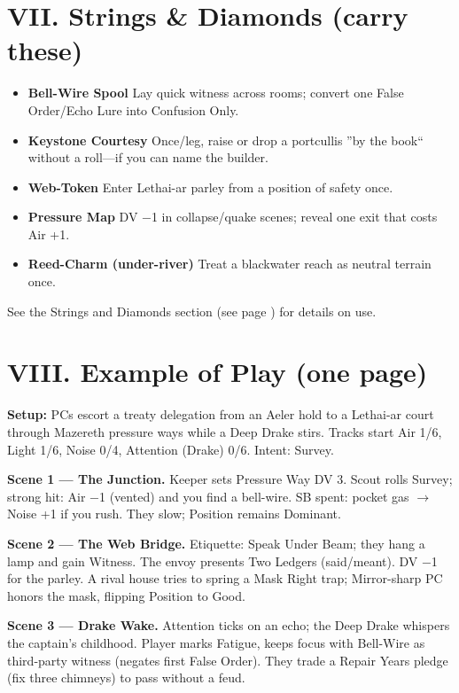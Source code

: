 \documentclass[11pt]{article}
\begin{document}
\section{VII. Strings \& Diamonds (carry these)}
\label{sec:stringdiamond}

\begin{itemize}
    \item \textbf{Bell-Wire Spool} Lay quick witness across rooms; convert one False Order/Echo Lure into Confusion Only.
    \item \textbf{Keystone Courtesy} Once/leg, raise or drop a portcullis ''by the book`` without a roll---if you can name the builder.
    \item \textbf{Web-Token} Enter Lethai-ar parley from a position of safety once.
    \item \textbf{Pressure Map} DV −1 in collapse/quake scenes; reveal one exit that costs Air +1.
    \item \textbf{Reed-Charm (under-river)} Treat a blackwater reach as neutral terrain once.
\end{itemize}

\noindent See the Strings and Diamonds section (see page \pageref{sec:stringdiamond}) for details on use.

\section{VIII. Example of Play (one page)}
\textbf{Setup:} PCs escort a treaty delegation from an Aeler hold to a Lethai-ar court through Mazereth pressure ways while a Deep Drake stirs. Tracks start Air 1/6, Light 1/6, Noise 0/4, Attention (Drake) 0/6. Intent: Survey.

\textbf{Scene 1 --- The Junction.} Keeper sets Pressure Way DV 3. Scout rolls Survey; strong hit: Air −1 (vented) and you find a bell-wire. SB spent: pocket gas $\rightarrow$ Noise +1 if you rush. They slow; Position remains Dominant.

\textbf{Scene 2 --- The Web Bridge.} Etiquette: Speak Under Beam; they hang a lamp and gain Witness. The envoy presents Two Ledgers (said/meant). DV −1 for the parley. A rival house tries to spring a Mask Right trap; Mirror-sharp PC honors the mask, flipping Position to Good.

\textbf{Scene 3 --- Drake Wake.} Attention ticks on an echo; the Deep Drake whispers the captain's childhood. Player marks Fatigue, keeps focus with Bell-Wire as third-party witness (negates first False Order). They trade a Repair Years pledge (fix three chimneys) to pass without a feud.
\end{document}
